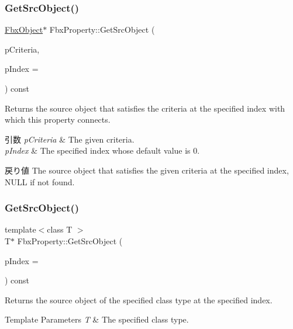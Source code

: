 \subsubsection{\texorpdfstring{Get\+Src\+Object()}{GetSrcObject()}\hspace{0.1cm}{\footnotesize\ttfamily [2/4]}}
{\footnotesize\ttfamily \hyperlink{class_fbx_object}{Fbx\+Object}$\ast$ Fbx\+Property\+::\+Get\+Src\+Object (\begin{DoxyParamCaption}\item[{const \hyperlink{class_fbx_criteria}{Fbx\+Criteria} \&}]{p\+Criteria,  }\item[{const int}]{p\+Index = {} }\end{DoxyParamCaption}) const}

Returns the source object that satisfies the criteria at the specified index with which this property connects. 
\begin{DoxyParams}{引数}
{\em p\+Criteria} & The given criteria. \\
\hline
{\em p\+Index} & The specified index whose default value is 0. \\
\hline
\end{DoxyParams}
\begin{DoxyReturn}{戻り値}
The source object that satisfies the given criteria at the specified index, N\+U\+LL if not found. 
\end{DoxyReturn}
\mbox{\label{class_fbx_property_a75fae8a9182ea51767ade157d614227a}} 
\subsubsection{\texorpdfstring{Get\+Src\+Object()}{GetSrcObject()}\hspace{0.1cm}{\footnotesize\ttfamily [3/4]}}
{\footnotesize\ttfamily template$<$class T $>$ \\
T$\ast$ Fbx\+Property\+::\+Get\+Src\+Object (\begin{DoxyParamCaption}\item[{const int}]{p\+Index = {} }\end{DoxyParamCaption}) const\hspace{0.3cm}{\ttfamily [inline]}}

Returns the source object of the specified class type at the specified index. 
\begin{DoxyTemplParams}{Template Parameters}
{\em T} & The specified class type. \\
\hline
\end{DoxyTemplParams}

